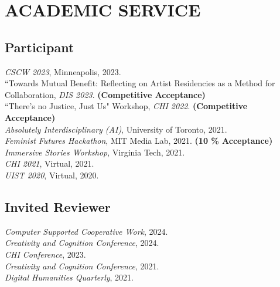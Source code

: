  \section{ACADEMIC SERVICE}

 \subsection{Participant}
 \emph{CSCW 2023}, Minneapolis, 2023.\\
 ``Towards Mutual Benefit: Reflecting on Artist Residencies as a Method for Collaboration, \emph{DIS 2023}. \textbf{(Competitive Acceptance)}\\
``There's no Justice, Just Us" Workshop, \emph{CHI 2022}. \textbf{(Competitive Acceptance)}\\
\emph{Absolutely Interdisciplinary (AI)}, University of Toronto, 2021.\\
\emph{Feminist Futures Hackathon}, MIT Media Lab, 2021. \textbf{(10 \% Acceptance)}\\
\emph{Immersive Stories Workshop}, Virginia Tech, 2021.\\
\emph{CHI 2021}, Virtual, 2021. \\
\emph{UIST 2020}, Virtual, 2020. 

  \subsection{Invited Reviewer}
     \emph{Computer Supported Cooperative Work}, 2024. \\
     \emph{Creativity and Cognition Conference}, 2024. \\
   \emph{CHI Conference}, 2023. \\
 \emph{Creativity and Cognition Conference}, 2021. \\
  \emph{Digital Humanities Quarterly}, 2021. \\